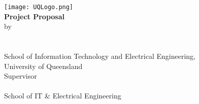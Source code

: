 \begin{titlepage}
	\begin{center}
		\texttt{[image: UQLogo.png]}\\
        \vfill
		\huge \textbf{Project Proposal}\\
        \huge \covertext
        \vfill
		\large by\\
		\vspace{5mm}
		\Large \authortext \\
        \large \studentnotext \\
        \large {}
        \vfill
		\large School of Information Technology and Electrical Engineering,\\\smallskip
        \large University of Queensland\\
        \vfill
        \small Supervisor \\
        \vspace{1mm}
        \large \supervisornametext \\
        \small School of IT \& Electrical Engineering \\
        \small {} \\
        \vfill
		\large \proposalduedate
	\end{center}
\end{titlepage}

\thispagestyle{empty}
\newpage
\setcounter{page}{1}